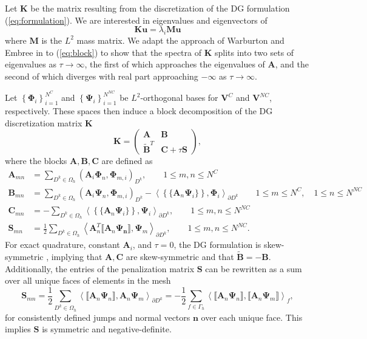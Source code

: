 \documentclass[preprint,10pt]{elsarticle}
\newcommand{\LRp}[1]{\left( #1 \right)}
\newcommand{\LRa}[1]{\left\langle #1 \right\rangle}
\newcommand{\LRc}[1]{\left\{ #1 \right\}}
\newcommand{\jump}[1] {\ensuremath{\llbracket#1\rrbracket}}
\newcommand{\avg}[1] {\ensuremath{\LRc{\!\{#1\}\!}}}
\newcommand{\Gh}{\Gamma_h}
\newcommand{\Oh}{\Omega_h}
\begin{document}
Let $\bm{K}$ be the matrix resulting from the discretization of the DG formulation (\ref{eq:formulation}).  We are interested in eigenvalues and eigenvectors of 
\[
\bm{K}\bm{u} = \lambda_i\bm{M}\bm{u}
\]
where $\bm{M}$ is the $L^2$ mass matrix.  We adapt the approach of Warburton and Embree in \cite{Warburton20063205} to (\ref{eq:block}) to show that the spectra of $\bm{K}$ splits into two sets of eigenvalues as $\tau\rightarrow \infty$, the first of which approaches the eigenvalues of $\bm{A}$, and the second of which diverges with real part approaching $-\infty$ as $\tau\rightarrow \infty$.  

Let $\LRc{\bm{\Phi}_i }_{i=1}^{N^{C}}$ and $\LRc{\bm{\Psi}_i }_{i=1}^{N^{NC}}$ be $L^2$-orthogonal bases for $\bm{V}^C$ and $\bm{V}^{NC}$, respectively.  These spaces then induce a block decomposition of the DG discretization matrix $\bm{K}$
\begin{equation}
\bm{K} = \left(\begin{array}{cc}
\bm{A} & \bm{B}\\
\tilde{\bm{B}}^T & \bm{C} + \tau \bm{S}
\end{array}\right),
\label{eq:block}
\end{equation}
where the blocks $\bm{A},\bm{B},\bm{C}$ are defined as
\begin{align*}
\bm{A}_{mn} &= \sum_{D^k\in \Oh} \LRp{\bm{A}_i\bm{\Phi}_n, \bm{\Phi}_{m,i}}_{D^k}, \qquad 1\leq m,n \leq N^C\\
\bm{B}_{mn} &= \sum_{D^k\in \Oh} \LRp{\bm{A}_i\bm{\Psi}_n, \bm{\Phi}_{m,i}}_{D^k} - \LRa{\avg{\bm{A}_n\bm{\Psi}_i}, {\bm{\Phi}_i}}_{\partial D^k} \qquad 1\leq m \leq N^C, \quad 1\leq n \leq N^{NC} \\
\bm{C}_{mn}  &= -\sum_{D^k\in \Oh} \LRa{\avg{\bm{A}_n\bm{\Psi}_i}, {\bm{\Psi}_i}}_{\partial D^k}, \qquad 1 \leq m,n \leq N^{NC}\\
\bm{S}_{mn}  &= \frac{1}{2}\sum_{D^k\in \Oh} \LRa{\bm{A}_n^T\jump{\bm{A}_n \bm{\Psi_n}}, {\bm{\Psi}_m}}_{\partial D^k}, \qquad 1 \leq m,n \leq N^{NC}.  
\end{align*}
For exact quadrature, constant $\bm{A}_i$, and $\tau = 0$, the DG formulation is skew-symmetric \cite{warburton2013low, chan2015gpu, chan2016weight2, kopriva2014energy}, implying that $\bm{A},\bm{C}$ are skew-symmetric and that $\tilde{\bm{B}} = -\bm{B}$.  Additionally, the entries of the penalization matrix $\bm{S}$ can be rewritten as a sum over all unique faces of elements in the mesh
\[
\bm{S}_{mn}  = \frac{1}{2}\sum_{D^k\in \Oh} \LRa{\jump{\bm{A}_n \bm{\Psi}_n}, \bm{A}_n{\bm{\Psi}_m}}_{\partial D^k} = -\frac{1}{2}\sum_{f \in \Gh} \LRa{\jump{\bm{A}_n \bm{\Psi}_n}, \jump{\bm{A}_n{\bm{\Psi}_m}}}_{f},
\]
for consistently defined jumps and normal vectors $\bm{n}$  over each unique face.  This implies $\bm{S}$ is symmetric and negative-definite.  
\end{document}
